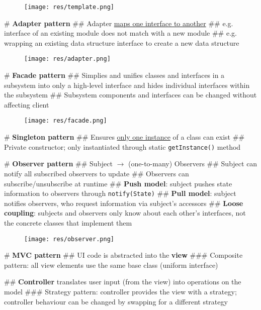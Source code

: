 \documentclass[11pt, oneside]{article}
\begin{document}
\begin{figure}[!ht]
    \centering
    \texttt{[image: res/template.png]}
\end{figure}

\newpage

# \textbf{Adapter pattern}
## Adapter \underline{maps one interface to another}
## e.g. interface of an existing module does not match with a new module
## e.g. wrapping an existing data structure interface to create a new data structure

\begin{figure}[!ht]
    \centering
    \texttt{[image: res/adapter.png]}
\end{figure}

# \textbf{Facade pattern}
## Simplies and unifies classes and interfaces in a subsystem into only a high-level interface and hides individual interfaces within the subsystem
## Subsystem components and interfaces can be changed without affecting client

\begin{figure}[!ht]
    \centering
    \texttt{[image: res/facade.png]}
\end{figure}

# \textbf{Singleton pattern}
## Ensures \underline{only one instance} of a class can exist
## Private constructor; only instantiated through static \texttt{getInstance()} method

\newpage
# \textbf{Observer pattern}
## Subject $\rightarrow$ (one-to-many) Observers
## Subject can notify all subscribed observers to update
## Observers can subscribe/unsubscribe at runtime
## \textbf{Push model}: subject pushes state information to observers through \texttt{notify(State)}
## \textbf{Pull model}: subject notifies observers, who request information via subject's accessors
## \textbf{Loose coupling}: subjects and observers only know about each other's interfaces, not the concrete classes that implement them

\begin{figure}[!ht]
    \centering
    \texttt{[image: res/observer.png]}
\end{figure}

# \textbf{MVC pattern}
## UI code is abstracted into the \textbf{view}
### Composite pattern: all view elements use the same base class (uniform interface)

## \textbf{Controller} translates user input (from the view) into operations on the model
### Strategy pattern: controller provides the view with a strategy; controller behaviour can be changed by swapping for a different strategy
\end{document}
